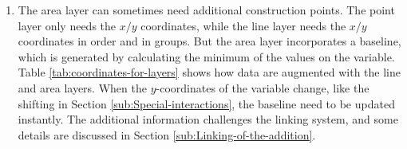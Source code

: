 \documentclass[12pt]{article}
\begin{document}
\begin{enumerate}

\item The area layer can sometimes need additional construction
points. The point layer only needs the $x/y$ coordinates, while
the line layer needs the $x/y$ coordinates in order and in groups.
But the area layer incorporates a baseline, which is generated
by calculating the minimum of the values on the variable.
Table \ref{tab:coordinates-for-layers} shows how data are
augmented with the line and area layers. When
the $y$-coordinates of the variable change, like the shifting in
Section \ref{sub:Special-interactions}, the baseline need to be
updated instantly. The additional information challenges the
linking system, and some details are discussed in Section
\ref{sub:Linking-of-the-addition}.


\end{enumerate}
\end{document}
